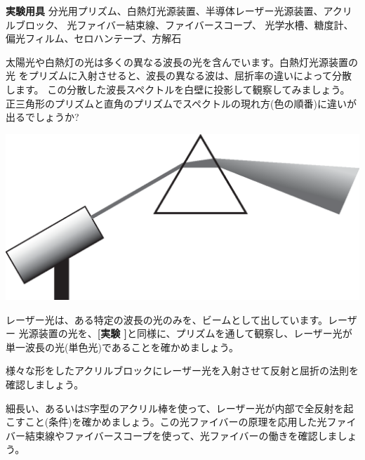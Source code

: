 \newpage

\jikken

\begin{itemsquarebox}[c]{\bf 実験用具}
分光用プリズム、白熱灯光源装置、半導体レーザー光源装置、アクリルブロック、
光ファイバー結束線、ファイバースコープ、
光学水槽、糖度計、偏光フィルム、セロハンテープ、方解石
\end{itemsquarebox}

\bigskip


太陽光や白熱灯の光は多くの異なる波長の光を含んでいます。白熱灯光源装置の光
をプリズムに入射させると、波長の異なる波は、屈折率の違いによって分散します。
この分散した波長スペクトルを白壁に投影して観察してみましょう。
正三角形のプリズムと直角のプリズムでスペクトルの現れ方(色の順番)に違いが出るでしょうか?
\begin{center}
\includegraphics[scale=0.4]{02_Refraction/prism.eps}
\end{center}



レーザー光は、ある特定の波長の光のみを、ビームとして出しています。レーザー
光源装置の光を、{\bf [実験 ]}と同様に、プリズムを通して観察し、レーザー光が
単一波長の光(単色光)であることを確かめましょう。

\bigskip



様々な形をしたアクリルブロックにレーザー光を入射させて反射と屈折の法則を確認しましょう。

\bigskip


細長い、あるいはS字型のアクリル棒を使って、レーザー光が内部で全反射を起こすこと(条件)を確かめましょう。この光ファイバーの原理を応用した光ファイバー結束線やファイバースコープを使って、光ファイバーの働きを確認しましょう。

